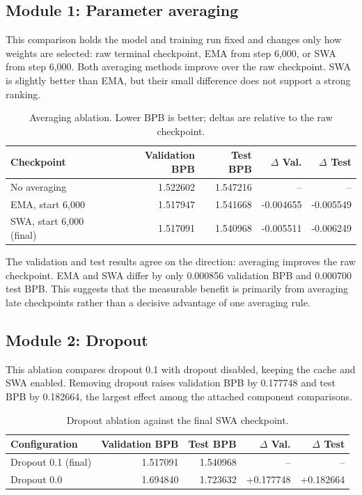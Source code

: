 \documentclass[11pt]{article}
\begin{document}
\subsection{Module 1: Parameter averaging}
This comparison holds the model and training run fixed and changes only how weights are selected: raw terminal checkpoint, EMA from step 6,000, or SWA from step 6,000. Both averaging methods improve over the raw checkpoint. SWA is slightly better than EMA, but their small difference does not support a strong ranking.

\begin{table}[ht]
\centering
\small
\caption{Averaging ablation. Lower BPB is better; deltas are relative to the raw checkpoint.}
\label{tab:ablation-averaging}
\begin{tabularx}{\linewidth}{@{}Xrrrr@{}}
\toprule
Checkpoint & Validation BPB & Test BPB & $\Delta$ Val. & $\Delta$ Test \\
\midrule
No averaging & 1.522602 & 1.547216 & -- & -- \\
EMA, start 6,000 & 1.517947 & 1.541668 & -0.004655 & -0.005549 \\
SWA, start 6,000 (final) & 1.517091 & 1.540968 & -0.005511 & -0.006249 \\
\bottomrule
\end{tabularx}
\end{table}

The validation and test results agree on the direction: averaging improves the raw checkpoint. EMA and SWA differ by only 0.000856 validation BPB and 0.000700 test BPB. This suggests that the measurable benefit is primarily from averaging late checkpoints rather than a decisive advantage of one averaging rule.

\subsection{Module 2: Dropout}
This ablation compares dropout 0.1 with dropout disabled, keeping the cache and SWA enabled. Removing dropout raises validation BPB by 0.177748 and test BPB by 0.182664, the largest effect among the attached component comparisons.

\begin{table}[ht]
\centering
\small
\caption{Dropout ablation against the final SWA checkpoint.}
\label{tab:ablation-dropout}
\begin{tabularx}{\linewidth}{@{}Xrrrr@{}}
\toprule
Configuration & Validation BPB & Test BPB & $\Delta$ Val. & $\Delta$ Test \\
\midrule
Dropout 0.1 (final) & 1.517091 & 1.540968 & -- & -- \\
Dropout 0.0 & 1.694840 & 1.723632 & +0.177748 & +0.182664 \\
\bottomrule
\end{tabularx}
\end{table}
\end{document}
